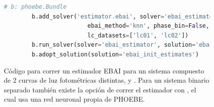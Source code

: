 \begin{figure}[!ht]
	\begin{lstlisting}[language=Python]
		# b: phoebe.Bundle
		b.add_solver('estimator.ebai', solver='ebai_estimator', 
						ebai_method='knn', phase_bin=False, 
						lc_datasets=['lc01', 'lc02'])
		b.run_solver(solver='ebai_estimator', solution='ebai_init_estimates')
		b.adopt_solution(solution='ebai_init_estimates')
	\end{lstlisting}
	\caption{Código para correr un estimador EBAI para un sistema compuesto de 2
	curvas de luz fotométricas distintas,  y . Para un
	sistema binario separado también existe la opción de correr el estimador con
	, el cual usa una red neuronal propia de PHOEBE.}
\end{figure}